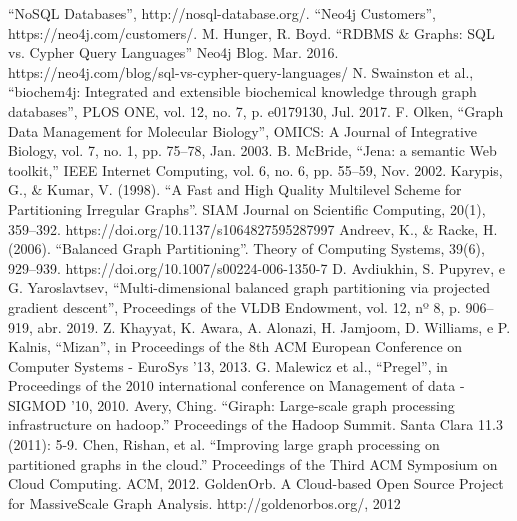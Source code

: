 \documentclass[conference]{IEEEtran}
\begin{document}
\begin{thebibliography}{00}
 ``NoSQL Databases'', http://nosql-database.org/.
 ``Neo4j Customers'', https://neo4j.com/customers/.
 M. Hunger, R. Boyd. ``RDBMS \& Graphs: SQL vs. Cypher Query Languages'' Neo4j Blog. Mar. 2016. https://neo4j.com/blog/sql-vs-cypher-query-languages/
 N. Swainston et al., ``biochem4j: Integrated and extensible biochemical knowledge through graph databases'', PLOS ONE, vol. 12, no. 7, p. e0179130, Jul. 2017.
 F. Olken, ``Graph Data Management for Molecular Biology'', OMICS: A Journal of Integrative Biology, vol. 7, no. 1, pp. 75–78, Jan. 2003.
 B. McBride, ``Jena: a semantic Web toolkit,” IEEE Internet Computing, vol. 6, no. 6, pp. 55–59, Nov. 2002.
 Karypis, G., \& Kumar, V. (1998). ``A Fast and High Quality Multilevel Scheme for Partitioning Irregular Graphs''. SIAM Journal on Scientific Computing, 20(1), 359–392. https://doi.org/10.1137/s1064827595287997
 Andreev, K., \& Racke, H. (2006). ``Balanced Graph Partitioning''. Theory of Computing Systems, 39(6), 929–939. https://doi.org/10.1007/s00224-006-1350-7
 D. Avdiukhin, S. Pupyrev, e G. Yaroslavtsev, ``Multi-dimensional balanced graph partitioning via projected gradient descent'', Proceedings of the VLDB Endowment, vol. 12, nº 8, p. 906–919, abr. 2019.
 Z. Khayyat, K. Awara, A. Alonazi, H. Jamjoom, D. Williams, e P. Kalnis, ``Mizan'', in Proceedings of the 8th ACM European Conference on Computer Systems - EuroSys ’13, 2013.
 G. Malewicz et al., ``Pregel'', in Proceedings of the 2010 international conference on Management of data - SIGMOD ’10, 2010.
 Avery, Ching. ``Giraph: Large-scale graph processing infrastructure on hadoop.'' Proceedings of the Hadoop Summit. Santa Clara 11.3 (2011): 5-9.
 Chen, Rishan, et al. ``Improving large graph processing on partitioned graphs in the cloud.'' Proceedings of the Third ACM Symposium on Cloud Computing. ACM, 2012.
 GoldenOrb. A Cloud-based Open Source Project for MassiveScale Graph Analysis. http://goldenorbos.org/, 2012

\end{thebibliography}
\end{document}
